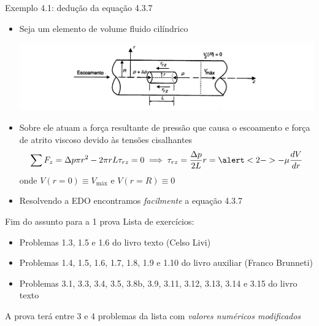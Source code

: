 \documentclass[t,%
brazilian,%
11pt,%
aspectratio=169,%
table%
]{beamer}
\newcommand{\esima}{\textordfeminine }
\begin{document}
\begin{frame}{Exemplo 4.1: dedução da equação 4.3.7}
    \begin{itemize}
        \item Seja um elemento de volume fluido cilíndrico

            \begin{center}
                \includegraphics[width=\textwidth-25pt]{images/Captura de tela de 2025-04-15 16-33-57.png}
            \end{center}

        \item Sobre ele atuam a força resultante de pressão que causa o escoamento e
            força de atrito viscoso devido às tensões cisalhantes
            \[
                \sum F_z = \Delta p \pi r^2 - 2\pi r L \tau_{rz} = 0 \implies 
                \tau_{rz} =\frac{\Delta p}{2L} r = \alert<2->{-}\mu \frac{d V}{d r}
            \]
            onde \(V(r=0) \equiv V_\text{máx}\) e \(V(r=R) \equiv 0\)
        \item Resolvendo a EDO encontramos \textit{facilmente} a equação 4.3.7

    \end{itemize}
\end{frame}

\begin{frame}{Fim do assunto para a 1\esima{} prova}
    Lista de exercícios:
    \begin{itemize}
        \item Problemas 1.3, 1.5 e 1.6 do livro texto (Celso Livi)
        \item Problemas 1.4, 1.5, 1.6, 1.7, 1.8, 1.9 e 1.10 do livro auxiliar (Franco Brunneti)
        \item Problemas 3.1, 3.3, 3.4, 3.5, 3.8b, 3.9, 3.11, 3.12, 3.13, 3.14 e 3.15 do livro texto
    \end{itemize}

    A prova terá entre 3 e 4 problemas da lista com \textit{valores numéricos modificados}
\end{frame}
\end{document}
